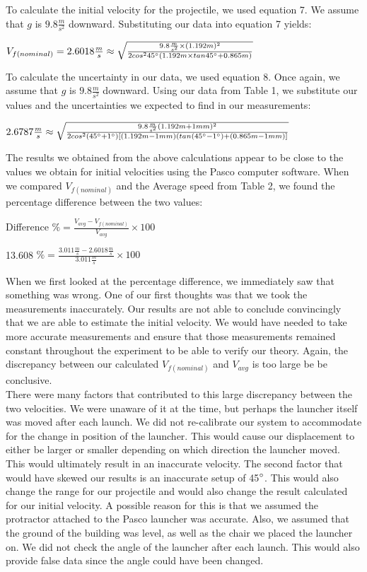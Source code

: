 \documentclass{article}
\begin{document}
To calculate the initial velocity for the projectile, we used equation 7. We assume that $g$ is $9.8\frac{m}{s^2}$ downward. Substituting our data into equation 7 yields:
\begin{center}$V_{f(nominal)} = 2.6018\frac{m}{s}\approx\sqrt{\frac{9.8\frac{m}{s^2}\times(1.192m)^2}{2cos{^2}45\degree(1.192m\times tan45\degree+0.865m)}}$\end{center}

To calculate the uncertainty in our data, we used equation 8. Once again, we assume that $g$ is $9.8\frac{m}{s^2}$ downward. 
Using our data from Table 1, we substitute our values and the uncertainties we expected to find in our measurements:
\begin{center}$2.6787\frac{m}{s}\approx\sqrt{\frac{9.8\frac{m}{s^2}(1.192m+1mm)^2}{2cos^2(45\degree+1\degree)[(1.192m-1mm)(tan(45\degree-1\degree)+(0.865m-1mm)]}}$
\end{center}

The results we obtained from the above calculations appear to be close to the values we obtain for initial velocities using the Pasco computer software. When we compared $V_{f(nominal)}$ and the Average speed from Table 2, we found the percentage difference between the two values:
\begin{center}Difference $\% = \frac{V_{avg}-V_{f(nominal)}}{V_{avg}}\times 100$\end{center}
\begin{center}13.608 $\% = \frac{3.011\frac{m}{s}-2.6018\frac{m}{s}}{3.011\frac{m}{s}}\times 100$\end{center}
When we first looked at the percentage difference, we immediately saw that something was wrong. One of our first thoughts was that we took the measurements inaccurately. Our results are not able to conclude convincingly that we are able to estimate the initial velocity. We would have needed to take more accurate measurements and ensure that those measurements remained constant throughout the experiment to be able to verify our theory. Again, the discrepancy between our calculated $V_{f(nominal)}$ and $V_{avg}$ is too large be be conclusive.\\\medskip
There were many factors that contributed to this large discrepancy between the two velocities. We were unaware of it at the time, but perhaps the launcher itself was moved after each launch. We did not re-calibrate our system to accommodate for the change in position of the launcher. This would cause our displacement to either be larger or smaller depending on which direction the launcher moved. This would ultimately result in an inaccurate velocity. The second factor that would have skewed our results is an inaccurate setup of 45$\degree$. This would also change the range for our projectile and would also change the result calculated for our initial velocity. A possible reason for this is that we assumed the protractor attached to the Pasco launcher was accurate. Also, we assumed that the ground of the building was level, as well as the chair we placed the launcher on. We did not check the angle of the launcher after each launch. This would also provide false data since the angle could have been changed.
\end{document}
